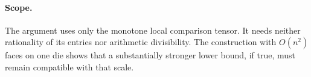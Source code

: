 \documentclass[11pt]{article}
\begin{document}
\paragraph{Scope.}
The argument uses only the monotone local comparison tensor. It needs
neither rationality of its entries nor arithmetic divisibility. The
construction with $O(n^2)$ faces on one die shows that a substantially
stronger lower bound, if true, must remain compatible with that scale.
\end{document}

